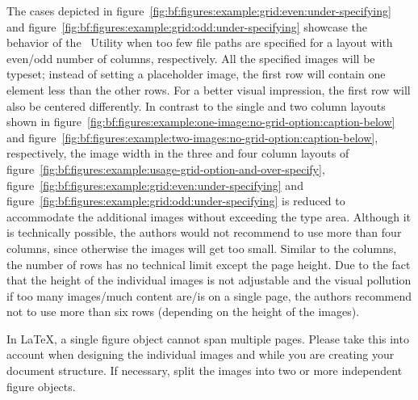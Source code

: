 	\newpage
	The cases depicted in \mbox{figure \ref{fig:bf:figures:example:grid:even:under-specifying}} and \mbox{figure \ref{fig:bf:figures:example:grid:odd:under-specifying}} showcase the behavior of the \productName~Utility when too few file paths are specified for a layout with even/odd number of columns, respectively. All the specified images will be typeset; instead of setting a placeholder image, the first row will contain one element less than the other rows. For a better visual impression, the first row will also be centered differently.
	\newline In contrast to the single and two column layouts shown in  \mbox{figure \ref{fig:bf:figures:example:one-image:no-grid-option:caption-below}} and \mbox{figure \ref{fig:bf:figures:example:two-images:no-grid-option:caption-below}}, respectively, the image width in the three and four column layouts of \mbox{figure \ref{fig:bf:figures:example:usage-grid-option-and-over-specify}},  \mbox{figure \ref{fig:bf:figures:example:grid:even:under-specifying}} and \mbox{figure \ref{fig:bf:figures:example:grid:odd:under-specifying}} is reduced to accommodate the additional images without exceeding the type area. Although it is technically possible, the authors would not recommend to use more than four columns, since otherwise the images will get too small. Similar to the columns, the number of rows has no technical limit except the page height. Due to the fact that the height of the individual images is not adjustable and the visual pollution if too many images/much content are/is on a single page, the authors recommend not to use more than six rows (depending on the height of the images).  
	\begin{daInfoBox}
		In \LaTeX, a single figure object cannot span multiple pages. Please take this into account when designing the individual images and while you are creating your document structure. If necessary, split the images into two or more independent figure objects. 
	\end{daInfoBox}